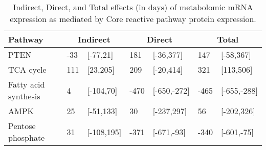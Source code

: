 \begin{table}[ht]
\centering
\begin{tabular}{lllllll}
  \hline
  Pathway & \multicolumn{2}{c}{Indirect} & \multicolumn{2}{c}{Direct}  & \multicolumn{2}{c}{Total} \\
 \hline
PTEN & -33 & [-77,21] & 181 & [-36,377] & 147 & [-58,367] \\ 
  TCA cycle & 111 & [23,205] & 209 & [-20,414] & 321 & [113,506] \\ 
  Fatty acid synthesis & 4 & [-104,70] & -470 & [-650,-272] & -465 & [-655,-288] \\ 
  AMPK & 25 & [-51,133] & 30 & [-237,297] & 56 & [-202,326] \\ 
  Pentose phosphate & 31 & [-108,195] & -371 & [-671,-93] & -340 & [-601,-75] \\ 
   \hline
\end{tabular}
\caption{Indirect, Direct, and Total effects (in days) of metabolomic mRNA expression as mediated by Core reactive pathway protein expression.} 
\end{table}
